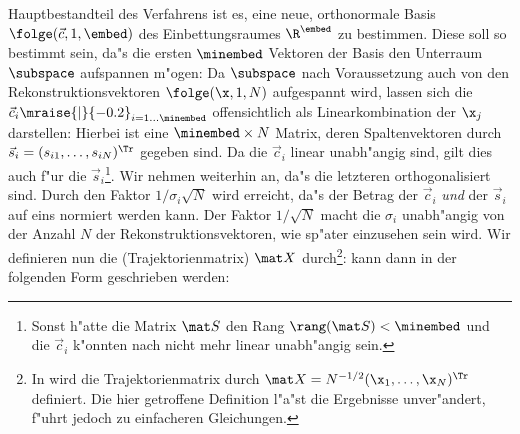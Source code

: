 Hauptbestandteil des Verfahrens ist es, eine neue, orthonormale Basis $\folge(\vec
c,1,\embed)$ des Einbettungsraumes $\R^\embed$ zu bestimmen. Diese soll so bestimmt sein,
da"s die ersten $\minembed$ Vektoren der Basis den Unterraum $\subspace$ aufspannen m"ogen:
Da $\subspace$ nach
Voraussetzung auch von den Rekonstruktionsvektoren $\folge(\x,1,N)$ aufgespannt wird,
lassen sich die $\vec c_i\mraise{\rvert}{-0.2}_{i=1\dots\minembed}$ offensichtlich als
Linearkombination der $\x_j$ darstellen:
Hierbei ist
eine $\minembed\times N$ Matrix, deren Spaltenvektoren 
durch $\vec s_i = (s_{i1},\dots,s_{iN})^\Tr$ gegeben sind.
Da die $\vec c_i$ linear unabh"angig sind, gilt dies auch f"ur die
$\vec s_i$\footnote{Sonst h"atte die Matrix $\mat S$ den
  Rang $\rang(\mat S)<\minembed$ und die $\vec c_i$ k"onnten nach  nicht mehr
  linear unabh"angig sein.}. Wir nehmen weiterhin an, da"s die letzteren orthogonalisiert
sind. Durch den Faktor $1/\sigma_i\sqrt N$ wird erreicht, da"s der Betrag der $\vec c_i$
{\em und} der  $\vec s_i$ auf eins normiert werden kann. Der Faktor $1/\sqrt N$ macht die $\sigma_i$
unabh"angig von der Anzahl $N$ der Rekonstruktionsvektoren, wie sp"ater einzusehen sein wird.  
Wir definieren nun die \begriff(Trajektorienmatrix) $\mat X$ durch\footnote{In
  \cite{Broomhead-king} wird die Trajektorienmatrix durch $\mat X = N^{-1/2}(\x_1, \dots,
  \x_N)^\Tr$ definiert. Die hier getroffene Definition l"a"st die Ergebnisse unver"andert,
  f"uhrt jedoch zu einfacheren Gleichungen.}:
 kann dann in der folgenden Form geschrieben werden: 


